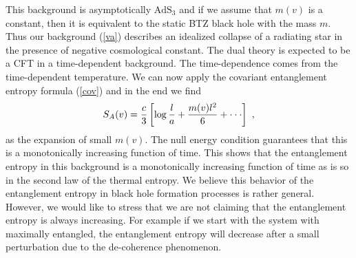 \documentclass[12pt]{article}
\def\frac#1#2{{#1\over #2}}
\def\frac#1#2{{#1\over #2}}
\begin{document}
This background is asymptotically
$\mathrm{AdS}_3$ and if we assume that
$m(v)$ is a constant, then it is equivalent to the static BTZ black
hole \cite{BTZ} with the mass $m$. Thus our background (\ref{va})
describes an idealized collapse of a radiating star in the presence
of negative cosmological constant. The dual theory is expected to be
a CFT in a time-dependent background. The time-dependence comes from
the time-dependent temperature. We can now apply the covariant
entanglement entropy formula (\ref{cov}) and in the end we find
\begin{equation}\label{res}
S_A(v)=\frac{c}{3}\left[\log
\frac{l}{a}+\frac{m(v)l^2}{6}+\cdot\cdot\cdot\right]\ ,
\end{equation}
as the expansion of small $m(v)$. The null energy condition
guarantees that this is a monotonically increasing function of time.
This shows that the entanglement entropy in this background is a
monotonically increasing function of time as is so in the second law
of the thermal entropy. We believe this behavior of
the entanglement
entropy in black hole formation processes is rather general.
However, we would like to stress that we are not claiming that the
entanglement entropy is always increasing. For example if we start
with the system with maximally entangled, the entanglement entropy
will decrease after a small perturbation due to the de-coherence
phenomenon.
\end{document}
